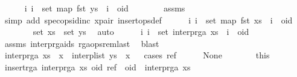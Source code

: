 \begin{isabellebody}
\ \ \ \ \isamarkupfalse%
\ {\isachardoublequoteopen}{\isasymAnd}i{\isachardot}\ i\ {\isasymin}\ set\ {\isacharparenleft}map\ fst\ ys{\isacharparenright}\ {\isasymLongrightarrow}\ i\ {\isacharless}\ oid{\isachardoublequoteclose}\isanewline
\ \ \ \ \ \ \isamarkupfalse%
\ assms{\isacharparenleft}{}{\isacharparenright}\ \isamarkupfalse%
\ {\isacharparenleft}simp\ add{\isacharcolon}\ spec{\isacharunderscore}ops{\isacharunderscore}id{\isacharunderscore}inc\ x{\isacharunderscore}pair\ insert{\isacharunderscore}ops{\isacharunderscore}def{\isacharparenright}\isanewline
\ \ \ \ \isamarkupfalse%
\ {\isachardoublequoteopen}{\isasymAnd}i{\isachardot}\ i\ {\isasymin}\ set\ {\isacharparenleft}map\ fst\ xs{\isacharparenright}\ {\isasymLongrightarrow}\ i\ {\isacharless}\ oid{\isachardoublequoteclose}\isanewline
\ \ \ \ \ \ \isamarkupfalse%
\ {\isacartoucheopen}set\ xs\ {\isacharequal}\ set\ ys{\isacartoucheclose}\ \isamarkupfalse%
\ auto\isanewline
\ \ \ \ \isamarkupfalse%
\ {\isachardoublequoteopen}{\isasymAnd}i{\isachardot}\ i\ {\isasymin}\ set\ {\isacharparenleft}interp{\isacharunderscore}rga\ xs{\isacharparenright}\ {\isasymLongrightarrow}\ i\ {\isacharless}\ oid{\isachardoublequoteclose}\isanewline
\ \ \ \ \ \ \isamarkupfalse%
\ assms{\isacharparenleft}{}{\isacharparenright}\ interp{\isacharunderscore}rga{\isacharunderscore}ids\ rga{\isacharunderscore}ops{\isacharunderscore}rem{\isacharunderscore}last\ \isamarkupfalse%
\ blast\isanewline
\ \ \isamarkupfalse%
\isanewline
\ \ \isamarkupfalse%
\ {\isachardoublequoteopen}interp{\isacharunderscore}rga\ {\isacharparenleft}xs\ {\isacharat}\ {\isacharbrackleft}x{\isacharbrackright}{\isacharparenright}\ {\isacharequal}\ interp{\isacharunderscore}list\ {\isacharparenleft}ys\ {\isacharat}\ {\isacharbrackleft}x{\isacharbrackright}{\isacharparenright}{\isachardoublequoteclose}\isanewline
\ \ \isamarkupfalse%
{\isacharparenleft}cases\ ref{\isacharparenright}\isanewline
\ \ \ \ \isamarkupfalse%
\ None\isanewline
\ \ \ \ \isamarkupfalse%
\ \isamarkupfalse%
\ this\ \isamarkupfalse%
\ {\isachardoublequoteopen}insert{\isacharunderscore}rga\ {\isacharparenleft}interp{\isacharunderscore}rga\ xs{\isacharparenright}\ {\isacharparenleft}oid{\isacharcomma}\ ref{\isacharparenright}\ {\isacharequal}\ oid\ {\isacharhash}\ interp{\isacharunderscore}rga\ xs{\isachardoublequoteclose}\isanewline

\end{isabellebody}
